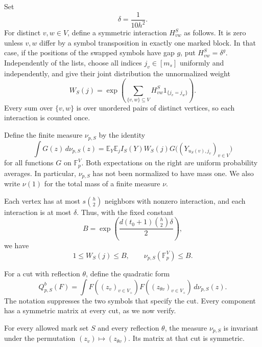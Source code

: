 Set
\[
 \delta=\frac1{10h^2}.
\]
For distinct \(v,w\in V\), define a symmetric interaction
\(H^S_{vw}\) as follows.  It is zero unless \(v,w\) differ by a
symbol transposition in exactly one marked block.  In that case,
if the positions of the swapped symbols have gap \(g\), put
\(H^S_{vw}=\delta^g\).  Independently of the lists, choose all
indices \(j_v\in[m_s]\) uniformly and independently, and give their
joint distribution the unnormalized weight
\begin{equation}
 W_S(j)=\exp\left(
 \sum_{\{v,w\}\subseteq V}H^S_{vw}1_{\{j_v=j_w\}}\right).
 \label{eq:tuple-index-weight}
\end{equation}
Every sum over \(\{v,w\}\) is over unordered pairs of distinct
vertices, so each interaction is counted once.

Define the finite measure \(\nu_{p,S}\) by the identity
\begin{equation}
 \int G(z)\,d\nu_{p,S}(z)
 =\mathbb E_Y\mathbb E_j I_S(Y)W_S(j)
 G\bigl((Y_{u_S(v),j_v})_{v\in V}\bigr)
 \label{eq:tuple-component-law}
\end{equation}
for all functions \(G\) on \(\mathbb F_p^V\).  Both expectations
on the right are uniform probability averages.  In particular,
\(\nu_{p,S}\) has not been normalized to have mass one.
We also write \(\nu(1)\) for the total mass of a finite measure \(\nu\).

Each vertex has at most \(s\binom h2\) neighbors with nonzero
interaction, and each interaction is at most \(\delta\).  Thus,
with the fixed constant
\begin{equation}
 B=\exp\left(\frac{d(t_0+1)\binom h2\delta}{2}\right),
 \label{eq:tuple-weight-bound}
\end{equation}
we have
\begin{equation}
 1\le W_S(j)\le B,\qquad \nu_{p,S}(\mathbb F_p^V)\le B.
 \label{eq:tuple-component-mass-upper}
\end{equation}

For a cut with reflection \(\theta\), define the quadratic form
\begin{equation}
 Q_{p,S}^{b}(F)=
 \int F((z_v)_{v\in V_+})
 F((z_{\theta v})_{v\in V_+})\,d\nu_{p,S}(z).
 \label{eq:tuple-cut-form}
\end{equation}
The notation suppresses the two symbols that specify the cut.
Every component has a symmetric matrix at every cut, as we now verify.

\begin{lemma}
\label{lem:tuple-component-symmetry}
For every allowed mark set \(S\) and every reflection \(\theta\),
the measure \(\nu_{p,S}\) is invariant under the permutation
\((z_v)\mapsto(z_{\theta v})\).  Its matrix at that cut is symmetric.
\end{lemma}

